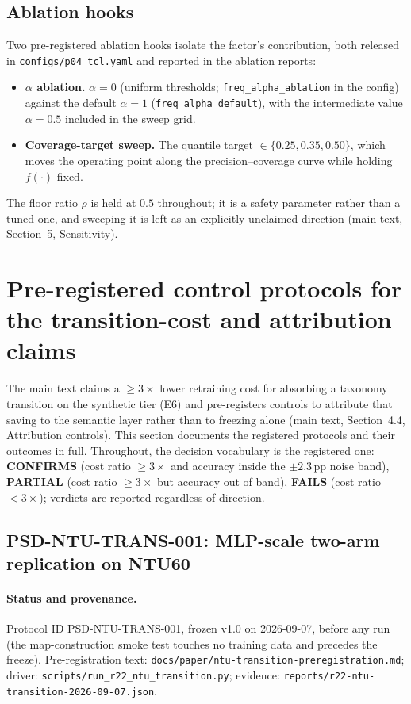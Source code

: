 \documentclass[11pt,a4paper]{article}
\begin{document}
\subsection{Ablation hooks}

Two pre-registered ablation hooks isolate the factor's contribution, both released in \texttt{configs/p04\_tcl.yaml} and reported in the ablation reports:
\begin{itemize}
\item \textbf{$\alpha$ ablation.} $\alpha = 0$ (uniform thresholds; \texttt{freq\_alpha\_ablation} in the config) against the default $\alpha = 1$ (\texttt{freq\_alpha\_default}), with the intermediate value $\alpha = 0.5$ included in the sweep grid.
\item \textbf{Coverage-target sweep.} The quantile target $\in \{0.25, 0.35, 0.50\}$, which moves the operating point along the precision--coverage curve while holding $f(\cdot)$ fixed.
\end{itemize}
The floor ratio $\rho$ is held at $0.5$ throughout; it is a safety parameter rather than a tuned one, and sweeping it is left as an explicitly unclaimed direction (main text, Section~5, Sensitivity).

\section{Pre-registered control protocols for the transition-cost and attribution claims}\label{app:trans}

The main text claims a $\geq 3\times$ lower retraining cost for absorbing a taxonomy transition on the synthetic tier (E6) and pre-registers controls to attribute that saving to the semantic layer rather than to freezing alone (main text, Section~4.4, Attribution controls). This section documents the registered protocols and their outcomes in full. Throughout, the decision vocabulary is the registered one: \textbf{CONFIRMS} (cost ratio $\geq 3\times$ and accuracy inside the $\pm 2.3$\,pp noise band), \textbf{PARTIAL} (cost ratio $\geq 3\times$ but accuracy out of band), \textbf{FAILS} (cost ratio $< 3\times$); verdicts are reported regardless of direction.

\subsection{PSD-NTU-TRANS-001: MLP-scale two-arm replication on NTU60}\label{app:trans001}

\paragraph{Status and provenance.}
Protocol ID PSD-NTU-TRANS-001, frozen v1.0 on 2026-09-07, before any run (the map-construction smoke test touches no training data and precedes the freeze). Pre-registration text: \texttt{docs/paper/ntu-transition-preregistration.md}; driver: \texttt{scripts/run\_r22\_ntu\_transition.py}; evidence: \texttt{reports/r22-ntu-transition-2026-09-07.json}.
\end{document}
